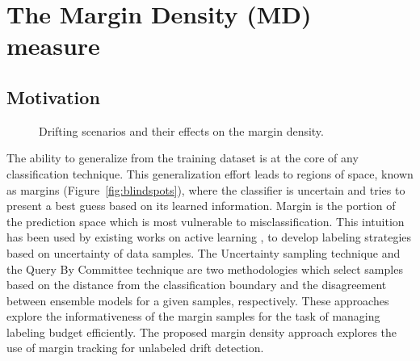 \documentclass[authoryear,3p,times,twocolumn]{elsarticle}
\begin{document}
\section{The Margin Density (MD) measure}
\label{sec:md}

\subsection{Motivation}
\label{sec:motivation}

\begin{figure}
\centering
{}
\hspace{1em}
\hspace{1em}
\caption{Drifting scenarios and their effects on the margin density.}
\label{fig:drifts}
\end{figure}

The ability to generalize from the training dataset is at the core of any classification technique. This generalization effort leads to regions of space, known as margins (Figure~\ref{fig:blindspots}), where the classifier is uncertain and tries to present a best guess based on its learned information. Margin is the portion of the prediction space which is most vulnerable to misclassification. This intuition has been used by existing works on active learning \citep{settles2010active,zliobaite2014active}, to develop labeling strategies based on uncertainty of data samples. The Uncertainty sampling technique  \citep{lindstrom2010handling} and the Query By Committee technique \citep{settles2010active} are two methodologies which select samples based on the distance from the classification boundary and the disagreement between ensemble models for a given samples, respectively. These approaches explore the informativeness of the margin samples for the task of managing labeling budget efficiently. The proposed margin density approach explores the use of margin tracking for unlabeled drift detection. 
\end{document}
